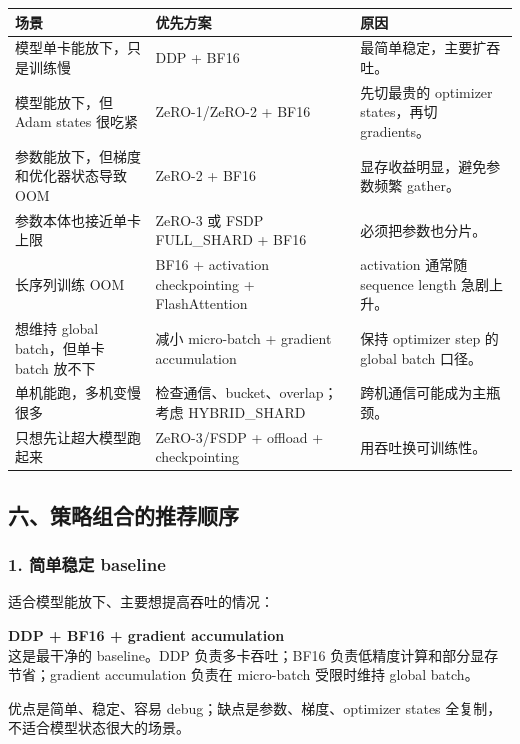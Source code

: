 \begin{center}
{\small
\begin{tabular}{p{4.3cm}p{4.4cm}p{4.2cm}}
\hline
\textbf{场景} & \textbf{优先方案} & \textbf{原因} \\
\hline
模型单卡能放下，只是训练慢 & DDP + BF16 & 最简单稳定，主要扩吞吐。 \\
模型能放下，但 Adam states 很吃紧 & ZeRO-1/ZeRO-2 + BF16 & 先切最贵的 optimizer states，再切 gradients。 \\
参数能放下，但梯度和优化器状态导致 OOM & ZeRO-2 + BF16 & 显存收益明显，避免参数频繁 gather。 \\
参数本体也接近单卡上限 & ZeRO-3 或 FSDP FULL\_SHARD + BF16 & 必须把参数也分片。 \\
长序列训练 OOM & BF16 + activation checkpointing + FlashAttention & activation 通常随 sequence length 急剧上升。 \\
想维持 global batch，但单卡 batch 放不下 & 减小 micro-batch + gradient accumulation & 保持 optimizer step 的 global batch 口径。 \\
单机能跑，多机变慢很多 & 检查通信、bucket、overlap；考虑 HYBRID\_SHARD & 跨机通信可能成为主瓶颈。 \\
只想先让超大模型跑起来 & ZeRO-3/FSDP + offload + checkpointing & 用吞吐换可训练性。 \\
\hline
\end{tabular}
}
\end{center}

\subsection{六、策略组合的推荐顺序}

\subsubsection*{1. 简单稳定 baseline}

适合模型能放下、主要想提高吞吐的情况：

\begin{summarybox}
\textbf{DDP + BF16 + gradient accumulation}\\
这是最干净的 baseline。DDP 负责多卡吞吐；BF16 负责低精度计算和部分显存节省；gradient accumulation 负责在 micro-batch 受限时维持 global batch。
\end{summarybox}

优点是简单、稳定、容易 debug；缺点是参数、梯度、optimizer states 全复制，不适合模型状态很大的场景。

